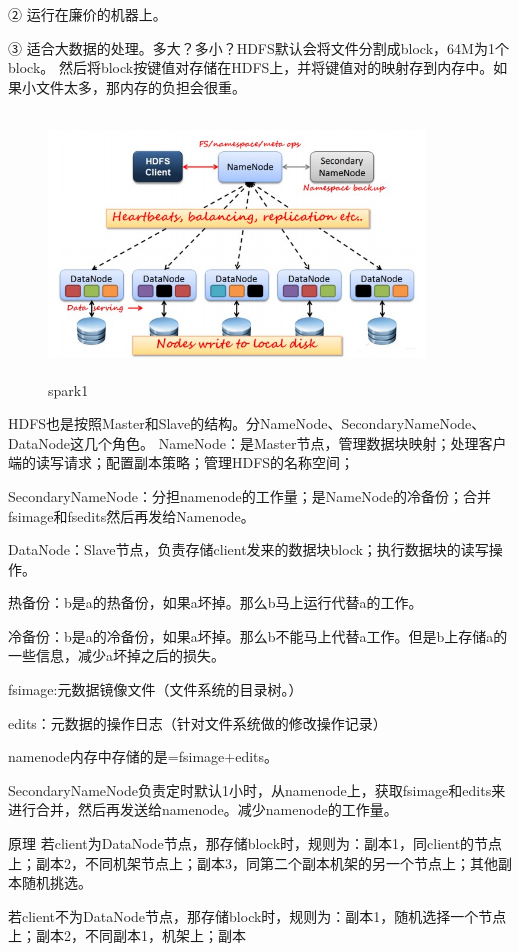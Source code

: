     ② 运行在廉价的机器上。

    ③ 适合大数据的处理。多大？多小？HDFS默认会将文件分割成block，64M为1个block。
    然后将block按键值对存储在HDFS上，并将键值对的映射存到内存中。如果小文件太多，那内存的负担会很重。
\begin{figure}[!h]
    \centering
    \includegraphics[height=7cm,width= 10cm]{img/hdfs.jpg}
    \caption{spark1}
\label{spark1}
\end{figure}
    HDFS也是按照Master和Slave的结构。分NameNode、SecondaryNameNode、DataNode这几个角色。
    NameNode：是Master节点，管理数据块映射；处理客户端的读写请求；配置副本策略；管理HDFS的名称空间；

SecondaryNameNode：分担namenode的工作量；是NameNode的冷备份；合并fsimage和fsedits然后再发给Namenode。

DataNode：Slave节点，负责存储client发来的数据块block；执行数据块的读写操作。

热备份：b是a的热备份，如果a坏掉。那么b马上运行代替a的工作。

冷备份：b是a的冷备份，如果a坏掉。那么b不能马上代替a工作。但是b上存储a的一些信息，减少a坏掉之后的损失。

fsimage:元数据镜像文件（文件系统的目录树。）

edits：元数据的操作日志（针对文件系统做的修改操作记录）

namenode内存中存储的是=fsimage+edits。

SecondaryNameNode负责定时默认1小时，从namenode上，获取fsimage和edits来进行合并，然后再发送给namenode。减少namenode的工作量。

原理
 若client为DataNode节点，那存储block时，规则为：副本1，同client的节点上；副本2，不同机架节点上；副本3，同第二个副本机架的另一个节点上；其他副本随机挑选。

若client不为DataNode节点，那存储block时，规则为：副本1，随机选择一个节点上；副本2，不同副本1，机架上；副本



